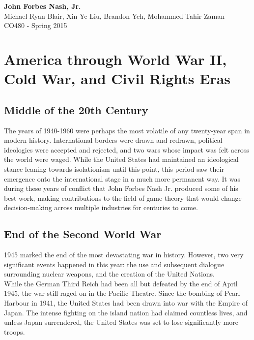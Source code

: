 \documentclass[12pt]{article}
\begin{document}
	\thispagestyle{empty}
	\setcounter{page}{1}
	\begin{center}
		\vspace*{3cm}	
		\textbf{\LARGE John Forbes Nash, Jr.}\\
		\vspace{5pt}
		\large Michael Ryan Blair, Xin Ye Liu, Brandon Yeh, Mohammed Tahir Zaman\\
		\vspace{5pt}
		CO480 - Spring 2015\\
	\end{center}
	
	\newpage
	
	\tableofcontents
	\newpage
	\singlespacing

\section{America through World War II, Cold War, and Civil Rights Eras}

\subsection{Middle of the 20th Century}

The years of 1940-1960 were perhaps the most volatile of any twenty-year span in modern history. International borders were drawn and redrawn, political ideologies were accepted and rejected, and two wars whose impact was felt across the world were waged. While the United States had maintained an ideological stance leaning towards isolationism until this point, this period saw their emergence onto the international stage in a much more permanent way. It was during these years of conflict that John Forbes Nash Jr. produced some of his best work, making contributions to the field of game theory that would change decision-making across multiple industries for centuries to come. 

\subsection{End of the Second World War}

1945 marked the end of the most devastating war in history. However, two very significant events happened in this year: the use and subsequent dialogue surrounding nuclear weapons, and the creation of the United Nations.\\

While the German Third Reich had been all but defeated by the end of April 1945\cite{1}, the war still raged on in the Pacific Theatre. Since the bombing of Pearl Harbour in 1941, the United States had been drawn into war with the Empire of Japan\cite{2}. The intense fighting on the island nation had claimed countless lives, and unless Japan surrendered, the United States was set to lose significantly more troops.\\
\end{document}
